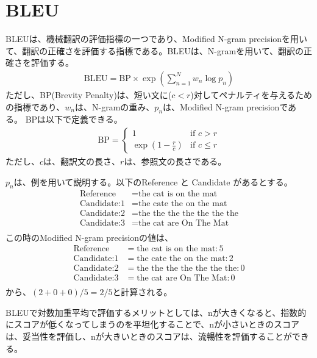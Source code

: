 \documentclass{ltjsarticle}
\begin{document}
\section{BLEU}
BLEUは、機械翻訳の評価指標の一つであり、Modified N-gram precisionを用いて、翻訳の正確さを評価する指標である。BLEUは、N-gramを用いて、翻訳の正確さを評価する。
\begin{align}
  \text{BLEU} = \text{BP} \times \exp\left( \sum_{n=1}^{N} w_n \log p_n \right)
\end{align}
ただし、BP(Brevity Penalty)は、短い文に($c<r$)対してペナルティを与えるための指標であり、$w_n$は、N-gramの重み、$p_n$は、Modified N-gram precisionである。
BPは以下で定義できる。
\begin{align}
  \text{BP} = \begin{cases}
    1 & \text{if } c > r \\
    \exp\left( 1 - \frac{r}{c} \right) & \text{if } c \leq r
  \end{cases}
\end{align}
ただし、$c$は、翻訳文の長さ、$r$は、参照文の長さである。
\par
$p_n$は、例を用いて説明する。以下のReference と Candidate があるとする。
\begin{align}
  \text{Reference} &= \text{the cat is on the mat} \\
  \text{Candidate:1} &= \text{the cate the on the mat}\\
  \text{Candidate:2} &= \text{the the the the the the the} \\
  \text{Candidate:3} &= \text{the cat are On The Mat}\\
\end{align}
この時のModified N-gram precisionの値は、
\begin{align}
  \text{Reference} &= \text{the cat is on the mat} : 5 \\
  \text{Candidate:1} &= \text{the cate the on the mat} : 2\\
  \text{Candidate:2} &= \text{the the the the the the the} : 0 \\
  \text{Candidate:3} &= \text{the cat are On The Mat} : 0\\
\end{align}
から、$(2+0+0)/5 = 2/5$と計算される。
\par
BLEUで対数加重平均で評価するメリットとしては、nが大きくなると、指数的にスコアが低くなってしまうのを平坦化することで、nが小さいときのスコアは、妥当性を評価し、nが大きいときのスコアは、流暢性を評価することができる。
\end{document}
